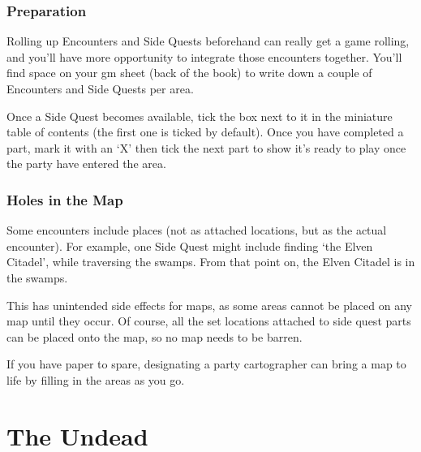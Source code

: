 \begin{multicols}{2}
\subsubsection{Preparation}

Rolling up Encounters and Side Quests beforehand can really get a game rolling, and you'll have more opportunity to integrate those encounters together.
You'll find space on your \gls{gm} sheet (back of the book) to write down a couple of Encounters and Side Quests per area.

Once a Side Quest becomes available, tick the box next to it in the miniature table of contents (the first one is ticked by default).
Once you have completed a part, mark it with an `X' then tick the next part to show it's ready to play once the party have entered the area.

\subsubsection{Holes in the Map}

Some encounters include places (not as attached locations, but as the actual encounter).
For example, one Side Quest might include finding `the Elven Citadel', while traversing the swamps.
From that point on, the Elven Citadel is in the swamps.

This has unintended side effects for maps, as some areas cannot be placed on any map until they occur.
Of course, all the set locations attached to side quest parts can be placed onto the map, so no map needs to be barren.

If you have paper to spare, designating a party cartographer can bring a map to life by filling in the areas as you go.

\end{multicols}

\section{The Undead}

